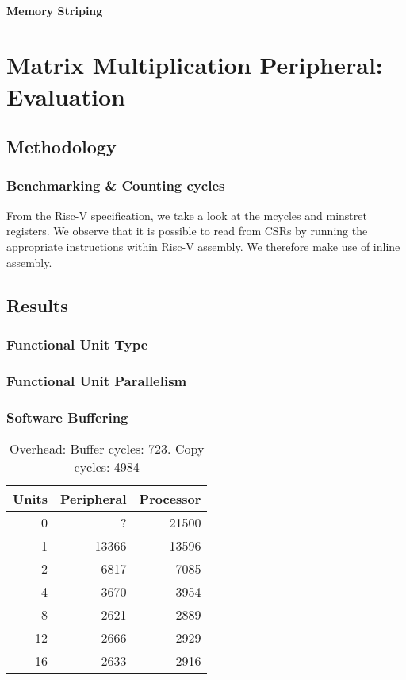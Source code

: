 \documentclass[a4paper,8pt]{report}
\begin{document}
% 




\subsubsection{Memory Striping}


\chapter{Matrix Multiplication Peripheral: Evaluation}
\section{Methodology}
\subsection{Benchmarking \& Counting cycles}
From the Risc-V specification, we take a look at the mcycles and minstret
registers. We observe that it is possible to read from CSRs by running the
appropriate instructions within Risc-V assembly. We therefore make use of inline
assembly.

\section{Results}
\subsection{Functional Unit Type}

\subsection{Functional Unit Parallelism}

\subsection{Software Buffering}
\begin{table}
  \centering
  \begin{tabular}{r|rr}
    \toprule
    Units & Peripheral & Processor\\
    \midrule
    0  &     ? & 21500 \\
    1  & 13366 & 13596 \\
    2  &  6817 &  7085 \\
    4  &  3670 &  3954 \\
    8  &  2621 &  2889 \\
    12 &  2666 &  2929 \\
    16 &  2633 &  2916 \\
    \bottomrule
  \end{tabular}
  \caption{Overhead: Buffer cycles: 723. Copy cycles: 4984}
\end{table}
\end{document}
